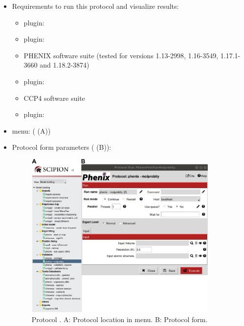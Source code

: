 \begin{itemize}
 \item Requirements to run this protocol and visualize results:
    \begin{itemize}
        \item \scipion plugin: 
        \item \scipion plugin: 
        \item PHENIX software suite (tested for versions 1.13-2998, 1.16-3549, 1.17.1-3660 and 1.18.2-3874)
        \item \scipion plugin: 
        \item CCP4 software suite 
        \item \scipion plugin: 
    \end{itemize}
 \item \scipion menu:
   ( (A))
  
 \item Protocol form parameters ( (B)):
  
    \begin{figure}[H]
     \centering 
     \captionsetup{width=.9\linewidth} 
     \includegraphics[width=0.90\textwidth]{Images_appendix/Fig143.pdf}
     \caption{Protocol . A: Protocol location in \scipion menu. B: Protocol form.}
     \label{fig:app_protocol_molprobity_1}
    \end{figure}


\end{itemize}
